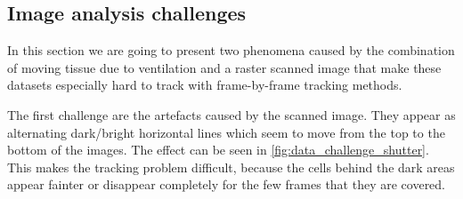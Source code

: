	\subsection{Image analysis challenges \statusseconddraft}
	\label{sec:data_challenges}
	In this section we are going to present two phenomena caused by the combination of moving tissue due to ventilation and a raster scanned image that make these datasets especially hard to track with frame-by-frame tracking methods.
	
	The first challenge are the artefacts caused by the scanned image. They appear as alternating dark/bright horizontal lines which seem to move from the top to the bottom of the images. The effect can be seen in \cref{fig:data_challenge_shutter}. This makes the tracking problem difficult, because the cells behind the dark areas appear fainter or disappear completely for the few frames that they are covered.
		
